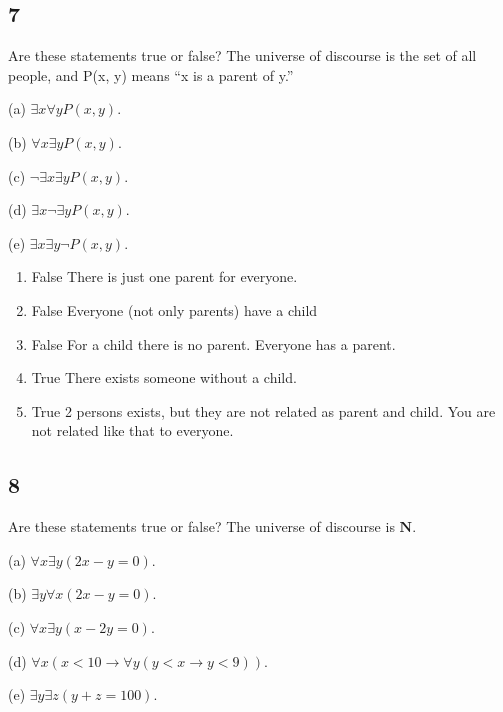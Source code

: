 \documentclass{article}
\begin{document}
\subsection{7}
Are these statements true or false? The universe of discourse is the set
of all people, and P(x, y) means “x is a parent of y.”

(a) $\exists x \forall yP(x, y)$.

(b) $\forall x \exists yP(x, y)$.

(c) $\neg \exists x \exists yP(x, y)$.

(d) $\exists x\neg \exists yP(x, y)$.

(e) $\exists x\exists y \neg P(x, y)$.
\begin{enumerate}[label=(\alph*)]
    \item
    False There is just one parent for everyone.
    \item
    False Everyone (not only parents) have a child
    \item
    False For a child there is no parent. Everyone has a parent.
    \item
    True There exists someone without a child.
    \item
    True 2 persons exists, but they are not related as parent and child. You are not related like that to everyone.
\end{enumerate}
\subsection{8}
Are these statements true or false? The universe of discourse is $\mathbf{N}$.

(a) $\forall x \exists y(2x - y = 0).$

(b) $\exists y \forall x(2x - y = 0).$

(c) $\forall x \exists y(x - 2y = 0).$

(d) $\forall x(x <10 \rightarrow \forall y(y < x \rightarrow y < 9)).$

(e) $\exists y\exists z(y + z = 100).$
\end{document}
